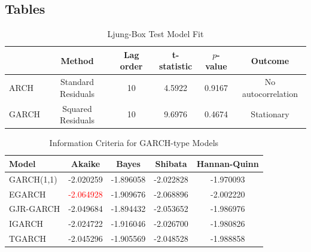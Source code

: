 \begin{appendices}
	\chapter{Tables}
	
	\begin{table}[!h]
		\centering
		\caption{Ljung-Box Test Model Fit}
		\begin{tabular}[t]{lccccc}
			\toprule
			   & Method &Lag order& t-statistic & $p$-value & Outcome  \\
			\midrule
			ARCH & Standard Residuals & 10 & 4.5922 & 0.9167 & No autocorrelation  \\				
			GARCH & Squared Residuals & 10& 9.6976 & 0.4674 & Stationary  \\				
			\bottomrule
		\end{tabular}\label{tab:ARCH_GARCH}
	\end{table}
	
	\begin{table}[!h]
		\centering
		\caption{Information Criteria for GARCH-type Models}
		\begin{tabular}{lcccc}
			\toprule
			\textbf{Model} & \textbf{Akaike} & \textbf{Bayes} & \textbf{Shibata} & \textbf{Hannan-Quinn} \\
			\midrule
			GARCH(1,1)     & -2.020259 & -1.896058 & -2.022828 & -1.970093 \\
			EGARCH         & \textcolor{red}{-2.064928} & -1.909676 & -2.068896 & -2.002220 \\
			GJR-GARCH      & -2.049684 & -1.894432 & -2.053652 & -1.986976 \\
			IGARCH         & -2.024722 & -1.916046 & -2.026700 & -1.980826 \\
			TGARCH         & -2.045296 & -1.905569 & -2.048528 & -1.988858 \\
			\bottomrule
		\end{tabular}\label{tab:GARCH_model}
	\end{table}
	

\end{appendices}